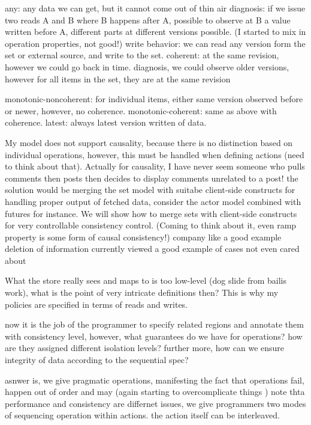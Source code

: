 \documentclass[preprint]{sigplanconf}
\begin{document}
any: any data we can get, but it cannot come out of thin air
diagnosis: if we issue two reads A and B where B happens after A, possible to observe at B a value written
before A, different parts at different versions possible. (I started to mix in operation properties, not good!)
write behavior: we can read any version form the set or external source, and
write to the set.
coherent: at the same revision, however we could go back in time.
diagnosis, we could observe older versions, however for all items in the set,
they are at the same revision

monotonic-noncoherent: for individual items, either same version observed before
or newer, however, no coherence. 
monotonic-coherent: same as above with coherence.
latest: always latest version written of data.

My model does not support causality, because there is no distinction based on
individual operations, however, this must be handled when defining actions (need
to think about that). Actually for causality, I have never seem someone who
pulls comments then posts then decides to display comments unrelated to a post!
the solution would be merging the set model with suitabe client-side constructs
for handling proper output of fetched data, consider the actor model combined
with futures for instance. We will show how to merge sets with client-side
constructs for very controllable consistency control.
(Coming to think about it, even ramp property is some form of causal
consistency!) 
company like a good example
deletion of information currently viewed a good example of cases not even cared
about

What the store really sees and maps to is too low-level (dog slide from bailis
work), what is the point of very intricate definitions then? This is why my
policies are specified in terms of reads and writes.

now it is the job of the programmer to specify related regions and annotate them
with consistency level, however, what guarantees do we have for operations? how
are they assigned different isolation levels?
further more, how can we ensure integrity of data according to the sequential
spec?

asnwer is, we give pragmatic operations, manifesting the fact that operations
fail, happen out of order and may (again starting to overcomplicate things )
note thta performance and consistency are differnet issues, we give programmers
two modes of sequencing operation within actions. the action itself can be
interleaved. 
\end{document}
